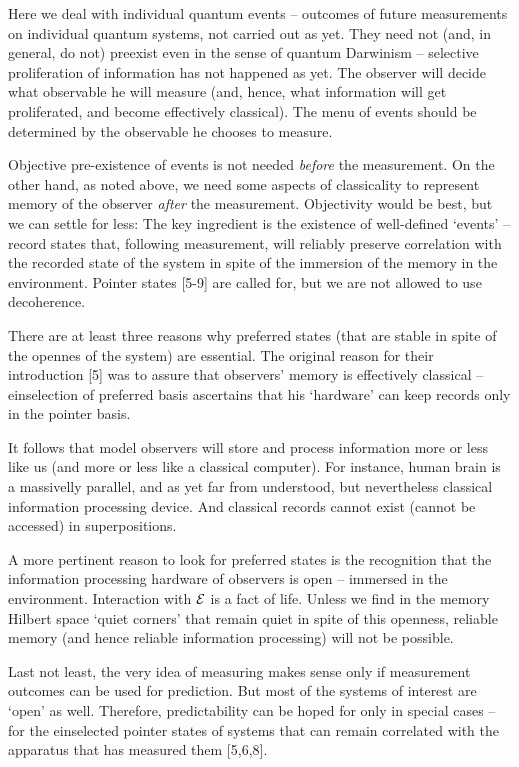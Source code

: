 \documentclass[aps,twocolumn,pra,epsfig]{revtex4}
\begin{document}
Here we deal with individual quantum events -- outcomes of future
measurements on individual quantum systems, not carried out as yet. They
need not (and, in general, do not) preexist even in the sense of quantum
Darwinism -- selective proliferation of information has not happened as yet.
The observer will decide what observable he will measure (and, hence, what
information will get proliferated, and become effectively classical). The menu of
events should be determined by the observable he chooses to measure.

Objective pre-existence of events is not needed {\it before} the measurement.
On the other hand, as noted above, we need some aspects of classicality to
represent memory of the observer {\it after} the measurement. Objectivity
would be best, but we can settle for less: The key ingredient is the
existence of well-defined `events' -- record states that, following measurement,
will reliably preserve correlation with the recorded state of the system
in spite of the immersion of the memory in the environment. Pointer 
states [5-9] are called for, but we are not allowed to use decoherence.

There are at least three reasons why preferred states (that are stable in spite
of the opennes of the system) are essential. The original reason for their
introduction [5] was  to assure that observers' memory is effectively classical 
-- einselection of preferred basis ascertains that his `hardware' 
can keep records only in the pointer basis.

It follows that model observers will store and process information more or less
like us (and more or less like a classical computer). For instance, human brain
is a massivelly parallel, and as yet far from understood, but nevertheless
classical information processing device. And classical records cannot exist
(cannot be accessed) in superpositions. 

A more pertinent reason to look for
preferred states is the recognition that the information processing hardware
of observers is open -- immersed in the environment. Interaction with 
${\cal E}$
is a fact of life. Unless we find in the memory Hilbert space `quiet corners'
that remain quiet in spite of this openness, reliable memory (and 
hence reliable
information processing) will not be possible. 

Last not least, the very
idea of measuring makes sense only if measurement outcomes can be used
for prediction. But most of the systems of interest are `open' as well.
Therefore, predictability can be hoped for only in special cases -- for the
einselected pointer states of systems that can remain correlated with
the apparatus that has measured them [5,6,8].
\end{document}
